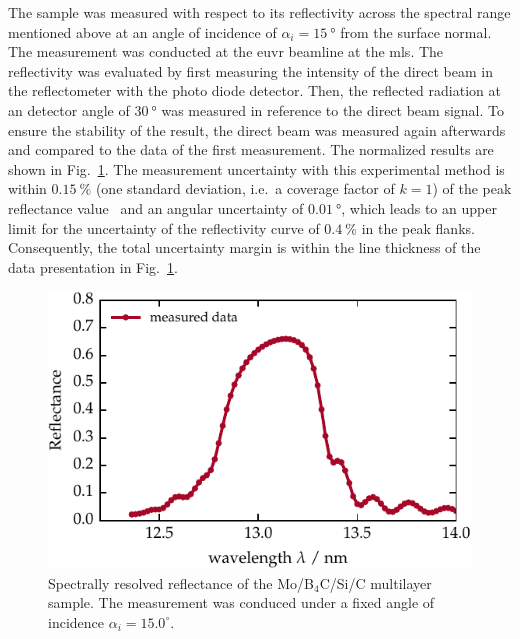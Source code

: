 The sample was measured with respect to its reflectivity across the spectral range mentioned above at an angle of incidence of $\alpha_i=\SI{15}{\degree}$ from the surface normal. The measurement was conducted at the \gls{euvr} beamline at the \gls{mls}. The reflectivity was evaluated by first measuring the intensity of the direct beam in the reflectometer with the photo diode detector. Then, the reflected radiation at an detector angle of $\SI{30}{\degree}$ was measured in reference to the direct beam signal. To ensure the stability of the result, the direct beam was measured again afterwards and compared to the data of the first measurement. The normalized results are shown in Fig.~\ref{ch_spec:fig_ptb17_reflectance_AOI_15}. The measurement uncertainty with this experimental method is within $\SI{0.15}{\percent}$ (one standard deviation, i.e.~a coverage factor of $k=1$) of the peak reflectance value~\cite{scholze_high-accuracy_2003} and an angular uncertainty of $\SI{0.01}{\degree}$, which leads to an upper limit for the uncertainty of the reflectivity curve of $\SI{0.4}{\percent}$ in the peak flanks. Consequently, the total uncertainty margin is within the line thickness of the data presentation in Fig.~\ref{ch_spec:fig_ptb17_reflectance_AOI_15}.
\begin{figure}[htbp]
\centering
\includegraphics{img/PTB17_reflectance_AOI_15}
\caption[Spectrally resolved reflectance of the Mo/B$_4$C/Si/C multilayer sample.]{Spectrally resolved reflectance of the Mo/B$_4$C/Si/C multilayer sample. The measurement was conduced under a fixed angle of incidence $\alpha_i = 15.0^\circ$.}
\label{ch_spec:fig_ptb17_reflectance_AOI_15}
\end{figure}

